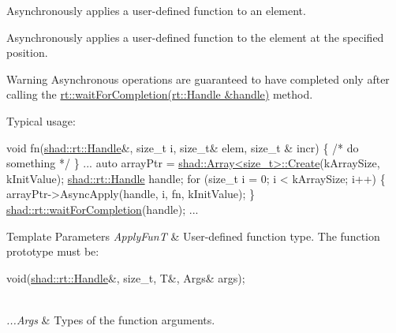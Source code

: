 Asynchronously applies a user-\/defined function to an element. 

Asynchronously applies a user-\/defined function to the element at the specified position.

\begin{DoxyWarning}{Warning}
Asynchronous operations are guaranteed to have completed only after calling the \hyperlink{namespaceshad_1_1rt_a6ea1d3672bac3a80032863b6732a0c0a}{rt\-::wait\-For\-Completion(rt\-::\-Handle \&handle)} method.
\end{DoxyWarning}
Typical usage\-: 
\begin{DoxyCode}
\textcolor{keywordtype}{void} fn(\hyperlink{classshad_1_1rt_1_1Handle}{shad::rt::Handle}&, \textcolor{keywordtype}{size\_t} i, \textcolor{keywordtype}{size\_t}& elem, \textcolor{keywordtype}{size\_t} & incr) \{
  \textcolor{comment}{/* do something */}
\}
...
auto arrayPtr = \hyperlink{classshad_1_1Array_a4ff830861f0ace4bf0a5e39e400b50f8}{shad::Array<size\_t>::Create}(kArraySize, kInitValue);
\hyperlink{classshad_1_1rt_1_1Handle}{shad::rt::Handle} handle;
\textcolor{keywordflow}{for} (\textcolor{keywordtype}{size\_t} i = 0; i < kArraySize; i++) \{
  arrayPtr->AsyncApply(handle, i, fn, kInitValue);
\}
\hyperlink{namespaceshad_1_1rt_a6ea1d3672bac3a80032863b6732a0c0a}{shad::rt::waitForCompletion}(handle);
...
\end{DoxyCode}



\begin{DoxyTemplParams}{Template Parameters}
{\em Apply\-Fun\-T} & User-\/defined function type. The function prototype must be\-: 
\begin{DoxyCode}
void(\hyperlink{classshad_1_1rt_1_1Handle}{shad::rt::Handle}&, \textcolor{keywordtype}{size\_t}, T&, Args& args);
\end{DoxyCode}
 \\
\hline
{\em ...\-Args} & Types of the function arguments.\\
\hline
\end{DoxyTemplParams}


